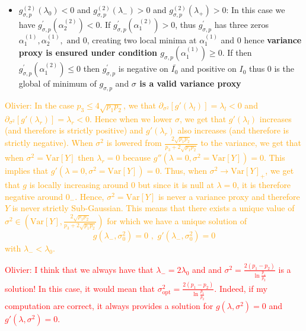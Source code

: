 \documentclass[a4paper, 10pt]{article}
\newcommand{\beq}{\begin{equation}}
\newcommand{\eeq}{\end{equation}}
\theoremstyle{definition}
\begin{document}
\begin{itemize}
\begin{itemize}
    \item  $g_{\sigma, p}^{(2)}(\lambda_0) < 0$ and $g_{\sigma, p}^{(2)}(\lambda_-) > 0$ and $g_{\sigma, p}^{(2)}(\lambda_+) > 0$: In this case we have $g^{'}_{\sigma, p}(\alpha^{(2)}_2)<0$. If $g^{'}_{\sigma, p}(\alpha^{(2)}_1)>0$, thus $g_{\sigma, p}^{'}$ has three zeros $\alpha_1^{(1)}, \alpha_2^{(1)}, \text{ and } 0$, creating two local minima at $\alpha_1^{(1)}$ and 0 hence \textbf{variance proxy is ensured under condition $g_{\sigma, p}(\alpha_1^{(1)}) \geq 0$}. If then $g^{'}_{\sigma, p}(\alpha^{(2)}_1) \leq 0$ then $g_{\sigma, p}^{'}$ is negative on $\bar{I_0}$ and positive on $I_0$ thus 0 is the global of minimum of $g_{\sigma, p}$ and \textbf{$\sigma$ is a valid variance proxy}
    \end{itemize}
    
\end{itemize}

\textcolor{orange}{Olivier: In the case $p_3\leq 4\sqrt{p_1p_2}$, we that $\partial_{\sigma^2}[g'(\lambda_l)]=\lambda_l<0$ and $\partial_{\sigma^2}[g'(\lambda_r)]=\lambda_r<0$. Hence when we lower $\sigma$, we get that $g'(\lambda_l)$ increases (and therefore is strictly positive) and $g'(\lambda_r)$ also increases (and therefore is strictly negative). When $\sigma^2$ is lowered  from $\frac{2\sqrt{p_1p_2}}{p_3+2\sqrt{p_1p_2}}$ to the variance, we get that when $\sigma^2=\text{Var}[Y]$ then $\lambda_r=0$ because $g''(\lambda=0,\sigma^2=\text{Var}[Y])=0$. This implies that $g'(\lambda=0,\sigma^2=\text{Var}[Y])=0$. Thus, when $\sigma^2\to \text{Var}[Y]_+$, we get that $g$ is locally increasing around $0$ but since it is null at $\lambda=0$, it is therefore negative around $0_-$. Hence, $\sigma^2=\text{Var}[Y]$ is never a variance proxy and therefore $Y$ is never strictly Sub-Gaussian. This means that there exists a unique value of $\sigma^2\in \left(\text{Var}[Y], \frac{2\sqrt{p_1p_2}}{p_3+2\sqrt{p_1p_2}}\right)$ for which we have a unique solution of 
\beq g(\lambda_-,\sigma_0^2)=0 \,\,,\,\,g'(\lambda_-,\sigma_0^2)=0 \eeq
with $\lambda_-<\lambda_0$.
}

\textcolor{red}{Olivier: I think that we always have that $\lambda_-=2\lambda_0$ and and $\sigma^2= \frac{2(p_1-p_2)}{\ln\frac{p_1}{p_2}}$ is a solution! In this case, it would mean that  $\sigma_{\text{opt}}^2=\frac{2(p_1-p_2)}{\ln\frac{p_1}{p_2}}$. Indeed, if my computation are correct, it always provides a solution for $g(\lambda,\sigma^2)=0$ and $g'(\lambda,\sigma^2)=0$. }

\newpage
\end{document}
